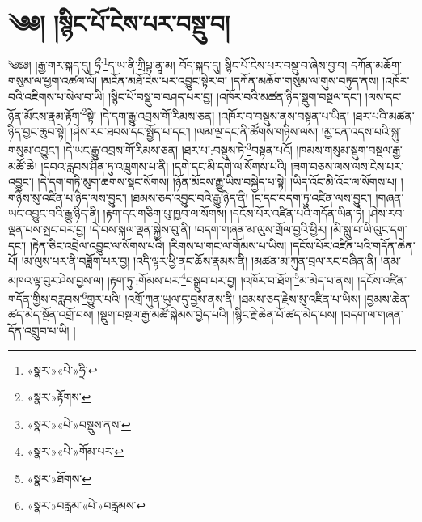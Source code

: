 \chapter{༄༅། །སྙིང་པོ་ངེས་པར་བསྡུ་བ།}༄༅༅། །རྒྱ་གར་སྐད་དུ། ཧྲྀ་\footnote{«སྣར་»«པེ་»ཧྲི་}ད་ཡ་ནི་ཀྲིཔྟ་ནཱ་མ། བོད་སྐད་དུ། སྙིང་པོ་ངེས་པར་བསྡུ་བ་ཞེས་བྱ་བ། དཀོན་མཆོག་གསུམ་ལ་ཕྱག་འཚལ་ལོ། །མངོན་མཐོ་ངེས་པར་འབྱུང་སྟེར་བ། །དཀོན་མཆོག་གསུམ་ལ་གུས་བཏུད་ནས། །འཁོར་བའི་འཇིགས་པ་སེལ་བ་ཡི། །སྙིང་པོ་བསྡུ་བ་བཤད་པར་བྱ། །འཁོར་བའི་མཚན་ཉིད་སྡུག་བསྔལ་དང་། །ལས་དང་ཉོན་མོངས་རྣམ་རྟོག་\footnote{«སྣར་»རྟོགས་}སྟེ། །དེ་དག་རྒྱུ་འབྲས་གོ་རིམས་ཅན། །འཁོར་བ་བསྡུས་ནས་བསྟན་པ་ཡིན། །ཐར་པའི་མཚན་ཉིད་བྱང་ཆུབ་སྟེ། །ཤེས་རབ་ཐབས་དང་སྤྱོད་པ་དང་། །ལམ་ལྔ་དང་ནི་ཚོགས་གཉིས་ལས། །མྱ་ངན་འདས་པའི་སྐུ་གསུམ་འབྱུང་། །དེ་ཡང་རྒྱུ་འབྲས་གོ་རིམས་ཅན། །ཐར་པ་:བསྡུས་ཏེ་\footnote{«སྣར་»«པེ་»བསྡུས་ནས་}བསྟན་པའོ། །ཁམས་གསུམ་སྡུག་བསྔལ་རྒྱ་མཚོ་ཆེ། །དབའ་རླབས་ཤིན་ཏུ་འཁྲུགས་པ་ནི། །དགེ་དང་མི་དགེ་ལ་སོགས་པའི། །ཟག་བཅས་ལས་ལས་ངེས་པར་འབྱུང་། །དེ་དག་གཏི་མུག་ཆགས་སྡང་སོགས། །ཉོན་མོངས་རྒྱུ་ཡིས་བསྐྱེད་པ་སྟེ། །ཡིད་འོང་མི་འོང་ལ་སོགས་པ། །གཉིས་སུ་འཛིན་པ་ཉིད་ལས་བྱུང་། །ཐམས་ཅད་འབྱུང་བའི་རྒྱུ་ཉིད་ནི། །ང་དང་བདག་ཏུ་འཛིན་ལས་བྱུང་། །གཞན་ཡང་འབྱུང་བའི་རྒྱུ་ཉིད་ནི། །རྟག་དང་གཅིག་པུ་ཁྱབ་ལ་སོགས། །དངོས་པོར་འཛིན་པའི་གདོན་ཡིན་ཏེ། །ཤེས་རབ་ལྡན་པས་སྤང་བར་བྱ། །དེ་བས་སྐལ་ལྡན་སྐྱེས་བུ་ནི། །བདག་གཞན་མ་ལུས་གྲོལ་བྱའི་ཕྱིར། །མི་སླུ་བ་ཡི་ལུང་དག་དང་། །རྟེན་ཅིང་འབྲེལ་འབྱུང་ལ་སོགས་པའི། །རིགས་པ་གང་ལ་གོམས་པ་ཡིས། །དངོས་པོར་འཛིན་པའི་གདོན་ཆེན་པོ། །མ་ལུས་པར་ནི་བཟློག་པར་བྱ། །འདི་ལྟར་ཕྱི་ནང་ཆོས་རྣམས་ནི། །མཚན་མ་ཀུན་བྲལ་རང་བཞིན་ནི། །ནམ་མཁའ་ལྟ་བུར་ཤེས་བྱས་ལ། །རྟག་ཏུ་:གོམས་པར་\footnote{«སྣར་»«པེ་»གོམ་པར་}བསྒྲུབ་པར་བྱ། །འཁོར་བ་ཐོག་\footnote{«སྣར་»ཐོགས་}མ་མེད་པ་ནས། །དངོས་འཛིན་གདོན་གྱིས་བརླབས་\footnote{«སྣར་»བརླམ་«པེ་»བརླམས་}གྱུར་པའི། །འགྲོ་ཀུན་ཡུལ་དུ་བྱས་ནས་ནི། །ཐམས་ཅད་རྗེས་སུ་འཛིན་པ་ཡིས། །བྱམས་ཆེན་ཚད་མེད་སྔོན་འགྲོ་བས། །སྡུག་བསྔལ་རྒྱ་མཚོ་སྐེམས་བྱེད་པའི། །སྙིང་རྗེ་ཆེན་པོ་ཚད་མེད་པས། །བདག་ལ་གཞན་དོན་འགྲུབ་པ་ཡི། །
